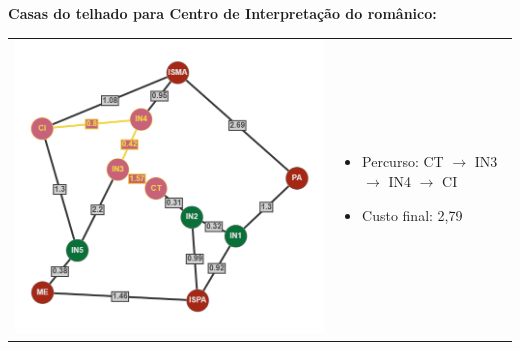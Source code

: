 \documentclass[12pt]{article}
\begin{document}
    \noindent \textbf{Casas do telhado para Centro de Interpretação do românico:}\\
    \begin{tabular}{@{}m{}m{}@{}}
      \centering\includegraphics[scale=0.4]{anexos/CT-CI.png} &
      \begin{itemize}
        \item  Percurso: CT $\rightarrow$ IN3 $\rightarrow$ IN4 $\rightarrow$ CI
        \item  Custo final: 2,79
      \end{itemize}
    \end{tabular}
\end{document}
